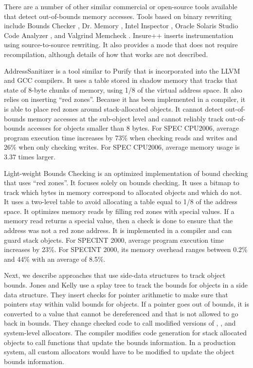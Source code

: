 There are a number of other similar commercial or open-source tools available
that detect out-of-bounds memory accesses.
Tools based on binary rewriting include Bounds Checker \cite{BoundsChecker2016}, 
Dr. Memory \cite{Bruening2011,DrMemory2016}, Intel Inspector \cite{Intel2016},
Oracle Solaris Studio Code Analyzer \cite{CodeAnalyzer2016},
and Valgrind Memcheck  \cite{Nethercote2007, Valgrind2016}.  Insure++ 
\cite{Insure2016}
inserts instrumentation using source-to-source rewriting.  It also provides
a mode that does not require recompilation, although details of how that
works are not described.

AddressSanitizer \cite{Serebryany2012} is a tool similar to Purify that is
incorporated into the LLVM and GCC compilers.  It uses a table
stored in shadow memory that tracks that state of 8-byte chunks of memory, using
1/8 of the virtual address space.  It also relies on inserting ``red zones''.
Because it has been implemented in a compiler, it is able to place red zones
around stack-allocated objects.   It cannot detect out-of-bounds memory
accesses at the sub-object level and cannot reliably track out-of-bounds accesses
for objects smaller than 8 bytes.  For SPEC CPU2006, average program execution time
increases by 73\% when checking reads and writes and 26\%
when only checking writes. For SPEC CPU2006, average memory usage is 
3.37 times larger.

Light-weight Bounds Checking \cite{Hasabnis2012} is an optimized implementation of bound
checking that uses ``red zones''.
It focuses solely on bounds checking.  It uses a bitmap to track
which bytes in memory correspond to allocated objects and which do not.
It uses a two-level table to avoid allocating a table equal to 1/8 of the
address space.  It optimizes memory reads by filling red zones with special
values.  If a memory read returns a special value, then a check is done to
ensure that the address was not a red zone address.  It is implemented in a compiler and can guard stack objects.  For SPECINT 2000, average 
program execution time increases by 23\%. For SPECINT 2000, its memory 
overhead ranges between 0.2\% and 44\% with an average of 8.5\%.

Next, we describe approaches that use side-data structures to track
object bounds.   
Jones and Kelly \cite{Jones1997} use a splay tree to track the bounds for
objects in a side data structure.  They insert 
checks for pointer arithmetic to make sure that pointers stay within valid bounds for
objects.  If a pointer goes out of bounds, it is converted to a value that cannot
be dereferenced and that is not allowed to go back in bounds. 
They change checked code to call modified versions of ,
, and system-level allocators.  The compiler modifies
code generation for stack allocated objects to call functions that update the 
bounds information. In a production system, all custom allocators would have to be
modified to update the object bounds information.  

